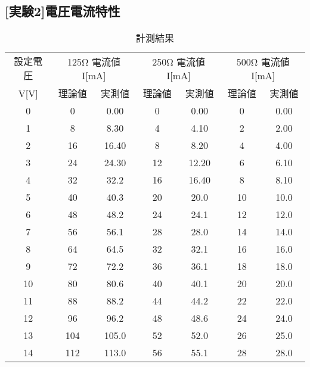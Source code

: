 \documentclass[titlepage]{jarticle}
\begin{document}
\subsection{[実験2]電圧電流特性}
\begin{table}[H]
    \centering
    \label{tab:tab`le2}
    \caption{計測結果}
    \begin{tabular}{c|c|c|c|c|c|c|c} \hline \hline
        \multicolumn{2}{c|}{設定電圧} & \multicolumn{2}{c|}{125Ω 電流値I[mA]} 
        & \multicolumn{2}{c|}{250Ω 電流値I[mA]} & \multicolumn{2}{c}{500Ω 電流値I[mA]}\\\cline{3-8}
        \multicolumn{2}{c|}{V[V]} & 理論値 & 実測値 & 理論値 & 実測値 & 理論値 & 実測値\\
    \hline
        \multicolumn{2}{c|}{0} & 0 & 0.00 & 0 & 0.00 & 0 & 0.00 \\\hline
        \multicolumn{2}{c|}{1} & 8 & 8.30 & 4 & 4.10 & 2 & 2.00 \\\hline
        \multicolumn{2}{c|}{2} & 16 & 16.40 & 8 & 8.20 & 4 & 4.00 \\ \hline
        \multicolumn{2}{c|}{3} & 24 & 24.30 & 12 & 12.20 & 6 & 6.10 \\ \hline
        \multicolumn{2}{c|}{4} & 32 & 32.2 & 16 & 16.40 & 8 & 8.10 \\ \hline
        \multicolumn{2}{c|}{5} & 40 & 40.3 & 20 & 20.0 & 10 & 10.0 \\ \hline
        \multicolumn{2}{c|}{6} & 48 & 48.2 & 24 & 24.1 & 12 & 12.0 \\ \hline
        \multicolumn{2}{c|}{7} & 56 & 56.1 & 28 & 28.0 & 14 & 14.0 \\ \hline
        \multicolumn{2}{c|}{8} & 64 & 64.5 & 32 & 32.1 & 16 & 16.0 \\ \hline
        \multicolumn{2}{c|}{9} & 72 & 72.2 & 36 & 36.1 & 18 & 18.0 \\ \hline
        \multicolumn{2}{c|}{10} & 80 & 80.6 & 40 & 40.1 & 20 & 20.0 \\ \hline
        \multicolumn{2}{c|}{11} & 88 & 88.2 & 44 & 44.2 & 22 & 22.0 \\ \hline
        \multicolumn{2}{c|}{12} & 96 & 96.2 & 48 & 48.6 & 24 & 24.0 \\ \hline
        \multicolumn{2}{c|}{13} & 104 & 105.0 & 52 & 52.0 & 26 & 25.0 \\ \hline
        \multicolumn{2}{c|}{14} & 112 & 113.0 & 56 & 55.1 & 28 & 28.0 \\ \hline
      \end{tabular}
\end{table}
\end{document}
